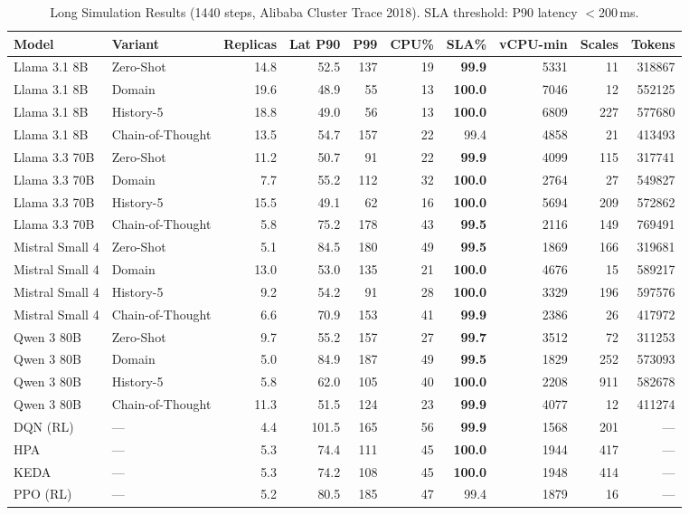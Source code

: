 \begin{table}[t]
\centering\small
\caption{Long Simulation Results (1440 steps, Alibaba Cluster Trace 2018). SLA threshold: P90 latency $<$200\,ms.}
\label{tab:long_sim}
\begin{tabular}{llrrrrrrrr}
\toprule
Model & Variant & Replicas & Lat P90 & P99 & CPU\% & SLA\% & vCPU-min & Scales & Tokens \\
\midrule
Llama 3.1 8B & Zero-Shot & 14.8 & 52.5 & 137 & 19 & \textbf{99.9} & 5331 & 11 & 318867 \\
Llama 3.1 8B & Domain & 19.6 & 48.9 & 55 & 13 & \textbf{100.0} & 7046 & 12 & 552125 \\
Llama 3.1 8B & History-5 & 18.8 & 49.0 & 56 & 13 & \textbf{100.0} & 6809 & 227 & 577680 \\
Llama 3.1 8B & Chain-of-Thought & 13.5 & 54.7 & 157 & 22 & 99.4 & 4858 & 21 & 413493 \\
\midrule
Llama 3.3 70B & Zero-Shot & 11.2 & 50.7 & 91 & 22 & \textbf{99.9} & 4099 & 115 & 317741 \\
Llama 3.3 70B & Domain & 7.7 & 55.2 & 112 & 32 & \textbf{100.0} & 2764 & 27 & 549827 \\
Llama 3.3 70B & History-5 & 15.5 & 49.1 & 62 & 16 & \textbf{100.0} & 5694 & 209 & 572862 \\
Llama 3.3 70B & Chain-of-Thought & 5.8 & 75.2 & 178 & 43 & \textbf{99.5} & 2116 & 149 & 769491 \\
\midrule
Mistral Small 4 & Zero-Shot & 5.1 & 84.5 & 180 & 49 & \textbf{99.5} & 1869 & 166 & 319681 \\
Mistral Small 4 & Domain & 13.0 & 53.0 & 135 & 21 & \textbf{100.0} & 4676 & 15 & 589217 \\
Mistral Small 4 & History-5 & 9.2 & 54.2 & 91 & 28 & \textbf{100.0} & 3329 & 196 & 597576 \\
Mistral Small 4 & Chain-of-Thought & 6.6 & 70.9 & 153 & 41 & \textbf{99.9} & 2386 & 26 & 417972 \\
\midrule
Qwen 3 80B & Zero-Shot & 9.7 & 55.2 & 157 & 27 & \textbf{99.7} & 3512 & 72 & 311253 \\
Qwen 3 80B & Domain & 5.0 & 84.9 & 187 & 49 & \textbf{99.5} & 1829 & 252 & 573093 \\
Qwen 3 80B & History-5 & 5.8 & 62.0 & 105 & 40 & \textbf{100.0} & 2208 & 911 & 582678 \\
Qwen 3 80B & Chain-of-Thought & 11.3 & 51.5 & 124 & 23 & \textbf{99.9} & 4077 & 12 & 411274 \\
\midrule
DQN (RL) & — & 4.4 & 101.5 & 165 & 56 & \textbf{99.9} & 1568 & 201 & — \\
HPA & — & 5.3 & 74.4 & 111 & 45 & \textbf{100.0} & 1944 & 417 & — \\
KEDA & — & 5.3 & 74.2 & 108 & 45 & \textbf{100.0} & 1948 & 414 & — \\
PPO (RL) & — & 5.2 & 80.5 & 185 & 47 & 99.4 & 1879 & 16 & — \\
\bottomrule
\end{tabular}
\end{table}
